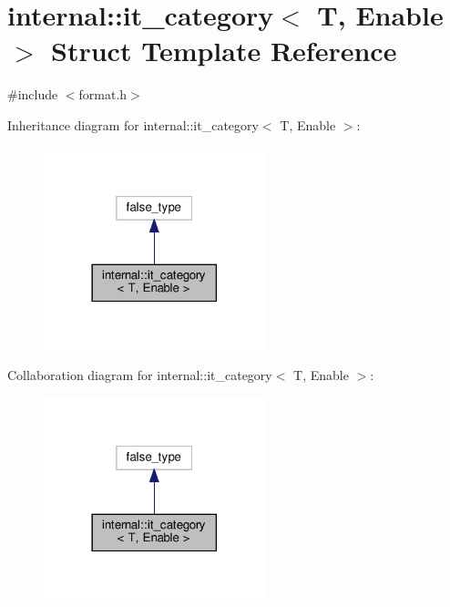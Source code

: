 \hypertarget{structinternal_1_1it__category}{}\section{internal\+:\+:it\+\_\+category$<$ T, Enable $>$ Struct Template Reference}
\label{structinternal_1_1it__category}


{\ttfamily \#include $<$format.\+h$>$}



Inheritance diagram for internal\+:\+:it\+\_\+category$<$ T, Enable $>$\+:
\nopagebreak
\begin{figure}[H]
\begin{center}
\leavevmode
\includegraphics[width=182pt]{structinternal_1_1it__category__inherit__graph}
\end{center}
\end{figure}


Collaboration diagram for internal\+:\+:it\+\_\+category$<$ T, Enable $>$\+:
\nopagebreak
\begin{figure}[H]
\begin{center}
\leavevmode
\includegraphics[width=182pt]{structinternal_1_1it__category__coll__graph}
\end{center}
\end{figure}


